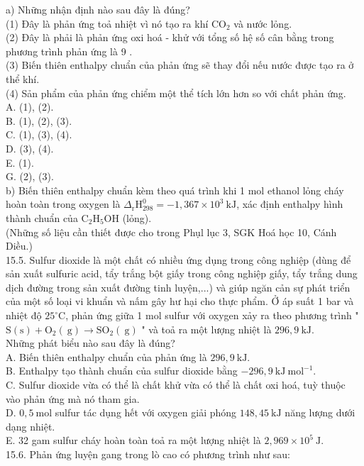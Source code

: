 \documentclass[10pt]{article}
\begin{document}
a) Những nhận định nào sau đây là đúng?\\
(1) Đây là phản ứng toả nhiệt vì nó tạo ra khí $\mathrm{CO}_{2}$ và nước lỏng.\\
(2) Đây là phải là phản ứng oxi hoá - khử với tổng số hệ số cân bằng trong phương trình phản ứng là 9 .\\
(3) Biến thiên enthalpy chuẩn của phản ứng sẽ thay đổi nếu nước được tạo ra ở thể khí.\\
(4) Sản phẩm của phản ứng chiểm một thể tích lớn hơn so với chất phản ứng.\\
A. (1), (2).\\
B. (1), (2), (3).\\
C. (1), (3), (4).\\
D. (3), (4).\\
E. (1).\\
G. (2), (3).\\
b) Biến thiên enthalpy chuẩn kèm theo quá trình khi 1 mol ethanol lỏng cháy hoàn toàn trong oxygen là $\Delta_{\mathrm{r}} \mathrm{H}_{298}^{0}=-1,367 \times 10^{3} \mathrm{~kJ}$, xác định enthalpy hình thành chuẩn của $\mathrm{C}_{2} \mathrm{H}_{5} \mathrm{OH}$ (lỏng).\\
(Những số liệu cần thiết được cho trong Phụl lục 3, SGK Hoá học 10, Cánh Diều.)\\
15.5. Sulfur dioxide là một chất có nhiều ứng dụng trong công nghiệp (dùng để sản xuất sulfuric acid, tẩy trắng bột giấy trong công nghiệp giấy, tẩy trắng dung dịch đường trong sản xuất đường tinh luyện,...) và giúp ngăn cản sự phát triển của một số loại vi khuẩn và nấm gây hư hại cho thực phẩm. Ở áp suất 1 bar và nhiệt độ $25^{\circ} \mathrm{C}$, phản ứng giữa 1 mol sulfur với oxygen xảy ra theo phương trình " $\mathrm{S}(\mathrm{s})+\mathrm{O}_{2}(\mathrm{~g}) \rightarrow \mathrm{SO}_{2}(\mathrm{~g})$ " và toả ra một lượng nhiệt là $296,9 \mathrm{~kJ}$.\\
Những phát biểu nào sau đây là đúng?\\
A. Biến thiên enthalpy chuẩn của phản ứng là $296,9 \mathrm{~kJ}$.\\
B. Enthalpy tạo thành chuẩn của sulfur dioxide bằng $-296,9 \mathrm{~kJ} \mathrm{~mol}^{-1}$.\\
C. Sulfur dioxide vừa có thể là chất khử vừa có thể là chất oxi hoá, tuỳ thuộc vào phản ứng mà nó tham gia.\\
D. $0,5 \mathrm{~mol}$ sulfur tác dụng hết với oxygen giải phóng $148,45 \mathrm{~kJ}$ năng lượng dưới dạng nhiệt.\\
E. 32 gam sulfur cháy hoàn toàn toả ra một lượng nhiệt là $2,969 \times 10^{5} \mathrm{~J}$.\\
15.6. Phản ứng luyện gang trong lò cao có phương trình như sau:
\end{document}
